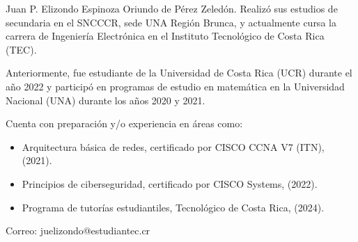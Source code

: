 \documentclass[journal]{IEEEtran}
\begin{document}
\begin{IEEEbiographynophoto}{Juan P. Elizondo Espinoza}
        Oriundo de Pérez Zeledón. Realizó sus estudios de secundaria en el SNCCCR, sede UNA Región Brunca, y actualmente cursa la carrera de Ingeniería Electrónica en el Instituto Tecnológico de Costa Rica (TEC). 
        
        Anteriormente, fue estudiante de la Universidad de Costa Rica (UCR) durante el año 2022 y participó en programas de estudio en matemática en la Universidad Nacional (UNA) durante los años 2020 y 2021. 
        
        Cuenta con preparación y/o experiencia en áreas como:
        \begin{itemize}
            \item Arquitectura básica de redes, certificado por CISCO CCNA V7 (ITN), (2021).
            \item Principios de ciberseguridad, certificado por CISCO Systems, (2022).
            \item Programa de tutorías estudiantiles, Tecnológico de Costa Rica, (2024).
        \end{itemize}
        
        Correo: juelizondo@estudiantec.cr
\end{IEEEbiographynophoto}





\end{document}
